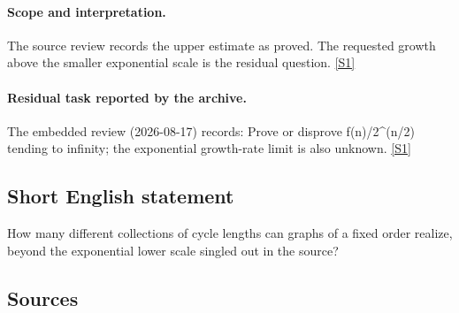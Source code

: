 \documentclass[11pt,a4paper]{article}
\newcommand{\sref}[2]{\hyperlink{source:#1:#2}{[S#2]}}
\begin{document}
\paragraph{Scope and interpretation.}

The source review records the upper estimate as proved. The requested growth above the smaller exponential scale is the residual question. \sref{statement}{1}

\paragraph{Residual task reported by the archive.}

The embedded review (2026-08-17) records: Prove or disprove f(n)/2\textasciicircum{}(n/2) tending to infinity; the exponential growth-rate limit is also unknown. \sref{statement}{1}

\subsection{Short English statement}

How many different collections of cycle lengths can graphs of a fixed order realize, beyond the exponential lower scale singled out in the source?

\subsection{Sources}
\end{document}

